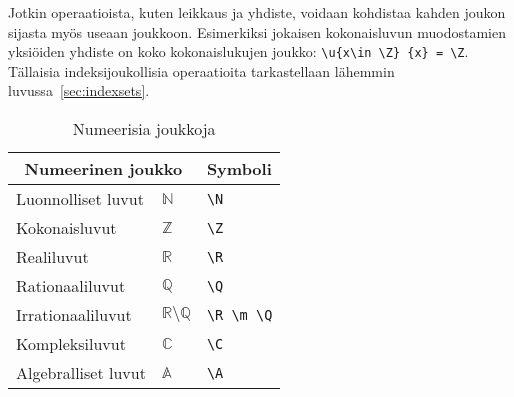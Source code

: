 Jotkin operaatioista, kuten leikkaus ja yhdiste, voidaan kohdistaa kahden joukon sijasta myös useaan joukkoon.
Esimerkiksi jokaisen kokonaisluvun muodostamien yksiöiden yhdiste on koko kokonaislukujen joukko: \verb$\u{x\in \Z} {x} = \Z$.
Tällaisia indeksijoukollisia operaatioita tarkastellaan lähemmin luvussa~\ref{sec:indexsets}.

\begin{table}[ht]
\begin{tabular}{ l|l|l }
\multicolumn{2}{c}{Numeerinen joukko} & Symboli \\ \hline
Luonnolliset luvut & $\mathbb{N}$ & \verb$\N$ \\
Kokonaisluvut & $\mathbb{Z}$ & \verb$\Z$ \\
Realiluvut & $\mathbb{R}$ & \verb$\R$ \\
Rationaaliluvut & $\mathbb{Q}$ & \verb$\Q$ \\
Irrationaaliluvut & $\mathbb{R} \setminus \mathbb{Q}$ & \verb$\R \m \Q$ \\
Kompleksiluvut & $\mathbb{C}$ & \verb$\C$ \\
Algebralliset luvut & $\mathbb{A}$ & \verb$\A$ \\
\end{tabular}
\caption{Numeerisia joukkoja}
\label{tbl:numeric}
\end{table}


